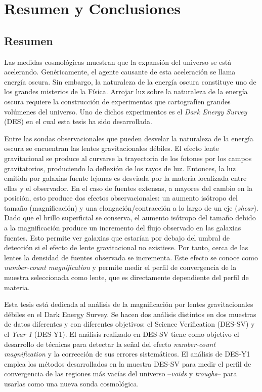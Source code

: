 \chapter*{Resumen y Conclusiones}
\section*{Resumen}
Las medidas cosmol\'ogicas muestran que la expansi\'on del universo se est\'a acelerando. Gen\'ericamente, el agente causante de esta aceleraci\'on se llama energ\'ia oscura. Sin embargo, la naturaleza de la energ\'ia oscura constituye uno de los grandes misterios de la F\'isica. Arrojar luz sobre la naturaleza de la energ\'ia oscura requiere la construcci\'on de experimentos que cartograf\'ien grandes vol\'umenes del universo. Uno de dichos experimentos es el {\it Dark Energy Survey} (DES) en el cual esta tesis ha sido desarrollada.
\newline

Entre las sondas observacionales que pueden desvelar la naturaleza de la energ\'ia oscura se encuentran las lentes gravitacionales d\'ebiles. El efecto lente gravitacional se produce al curvarse la trayectoria de los fotones por los campos gravitatorios, produciendo la deflexi\'on de los rayos de luz. Entonces, la luz emitida por galaxias fuente lejanas es desviada por la materia localizada entre ellas y el observador. En el caso de fuentes extensas, a mayores del cambio en la posici\'on, esto produce dos efectos observacionales: un aumento is\'otropo del tama\~no (magnificaci\'on) y una elongaci\'on/contracci\'on a lo largo de un eje ({\it shear}). Dado que el brillo superficial se conserva, el aumento is\'otropo del tama\~no debido a la magnificaci\'on produce un incremento del flujo observado en las galaxias fuentes. Esto permite ver galaxias que estar\'ian por debajo del umbral de detecci\'on si el efecto de lente gravitacional no existiese. Por tanto, cerca de las lentes la densidad de fuentes observada se incrementa. Este efecto se conoce como {\it number-count magnification} y permite medir el perfil de convergencia de la muestra seleccionada como lente, que es directamente dependiente del perfil de materia.
\newline

Esta tesis est\'a dedicada al an\'alisis de la magnificaci\'on por lentes gravitacionales d\'ebiles en el Dark Energy Survey. Se hacen dos an\'alisis distintos en dos muestras de datos diferentes y con diferentes objetivos: el {Science Verification} (DES-SV) y el {\it Year 1} (DES-Y1). El an\'alisis realizado en DES-SV tiene como objetivo el desarrollo de t\'ecnicas para detectar la se\~nal del efecto {\it number-count magnification} y la correcci\'on de sus errores sistem\'aticos. El an\'alisis de DES-Y1 emplea los m\'etodos desarrollados en la muestra DES-SV para medir el perfil de convergencia de las regiones m\'as vac\'ias del universo --{\it voids} y {\it troughs}-- para usarlas como una nueva sonda cosmol\'ogica.

